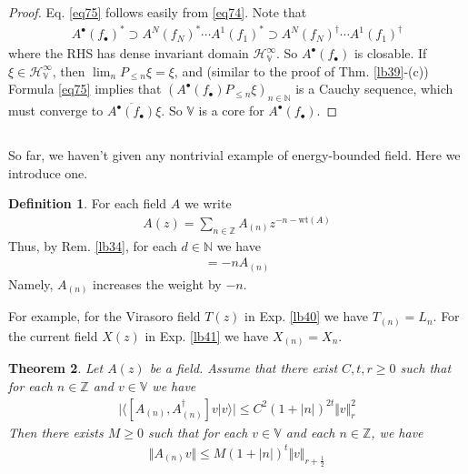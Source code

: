 \documentclass[12pt,b5paper,notitlepage]{article}
\theoremstyle{definition}
\newtheorem{df}{Definition}[section]
\theoremstyle{plain}
\newtheorem{thm}[df]{Theorem}
\newcommand{\ovl}{\overline}
\newcommand{\bk}[1]{\langle {#1}\rangle}
\newcommand{\blt}{\bullet}
\newcommand{\Vbb}{\mathbb V}
\newcommand{\Nbb}{\mathbb N}
\newcommand{\Zbb}{\mathbb Z}
\newcommand{\wt}{\mathrm{wt}}
\newcommand{\HV}{\mathcal H_{\mathbb V}}
\numberwithin{equation}{section}
\begin{document}
\begin{proof}
Eq. \eqref{eq75} follows easily from \eqref{eq74}. Note that
\begin{align}\label{eq128}
A^\blt(f_\blt)^*\supset A^N(f_N)^*\cdots A^1(f_1)^*\supset A^N(f_N)^\dagger\cdots A^1(f_1)^\dagger
\end{align}
where the RHS has dense invariant domain $\HV^\infty$. So $A^\blt(f_\blt)$ is closable. If $\xi\in\HV^\infty$, then $\lim_n P_{\leq n}\xi=\xi$, and (similar to the proof of Thm. \ref{lb39}-(c)) Formula \eqref{eq75} implies that $(A^\blt(f_\blt)P_{\leq n}\xi)_{n\in\Nbb}$ is a Cauchy sequence, which must converge to $\ovl{A^\blt(f_\blt)}\xi$. So $\Vbb$ is a core for $A^\blt(f_\blt)$.
\end{proof}



\subsection{}


So far, we haven't given any nontrivial example of energy-bounded field. Here we introduce one. 

\begin{df}
For each field $A$ we write 
\begin{align}
A(z)=\sum_{n\in\Zbb} A_{(n)}z^{-n-\wt(A)}
\end{align}
Thus, by Rem. \ref{lb34}, for each $d\in\Nbb$ we have
\begin{align}
[L_0,A_{(n)}]=-nA_{(n)}
\end{align}
Namely, $A_{(n)}$ increases the weight by $-n$.
\end{df}

For example, for the Virasoro field $T(z)$ in Exp. \ref{lb40} we have $T_{(n)}=L_n$. For the current field $X(z)$ in Exp. \ref{lb41} we have $X_{(n)}=X_n$.

\begin{thm}\label{lb42}
Let $A(z)$ be a field. Assume that there exist $C,t,r\geq0$ such that for each $n\in\Zbb$ and $v\in\Vbb$ we have
\begin{align}\label{eq66}
\big|\bk{[A_{(n)},A_{(n)}^\dagger]v|v}\big|\leq C^2(1+|n|)^{2t}\Vert v\Vert_r^2
\end{align}
Then there exists $M\geq0$ such that for each $v\in\Vbb$ and each  $n\in\Zbb$, we have
\begin{align}\label{eq65}
\Vert A_{(n)}v\Vert \leq M(1+|n|)^t\Vert v\Vert_{r+\frac 12}
\end{align}
\end{thm}
\end{document}
